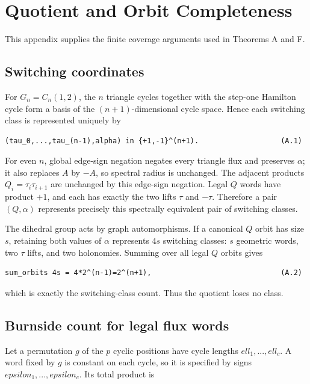 \section{Quotient and Orbit Completeness}

This appendix supplies the finite coverage arguments used in Theorems A and F.

\subsection{Switching coordinates}

For \(G_n=C_n(1,2)\), the \(n\) triangle cycles together with the step-one
Hamilton cycle form a basis of the \((n+1)\)-dimensional cycle space. Hence each
switching class is represented uniquely by

\begin{lstlisting}[language={}]
(tau_0,...,tau_(n-1),alpha) in {+1,-1}^(n+1).                   (A.1)
\end{lstlisting}

For even \(n\), global edge-sign negation negates every triangle flux and
preserves \(\alpha\); it also replaces \(A\) by \(-A\), so spectral radius is
unchanged. The adjacent products \(Q_i=\tau_i \tau_{i+1}\) are unchanged by this
edge-sign negation. Legal \(Q\) words have product \(+1\), and each has exactly the two lifts
\(\tau\) and \(-\tau\). Therefore a pair \((Q,\alpha)\) represents precisely this
spectrally equivalent pair of switching classes.

The dihedral group acts by graph automorphisms. If a canonical \(Q\) orbit has
size \(s\), retaining both values of \(\alpha\) represents \(4s\) switching classes:
\(s\) geometric words, two \(\tau\) lifts, and two holonomies. Summing over all
legal \(Q\) orbits gives

\begin{lstlisting}[language={}]
sum_orbits 4s = 4*2^(n-1)=2^(n+1),                              (A.2)
\end{lstlisting}

which is exactly the switching-class count. Thus the quotient loses no class.

\subsection{Burnside count for legal flux words}

Let a permutation \(g\) of the \(p\) cyclic positions have cycle lengths
\(ell_1,...,ell_c\). A word fixed by \(g\) is constant on each cycle, so it is
specified by signs \(epsilon_1,...,epsilon_c\). Its total product is

